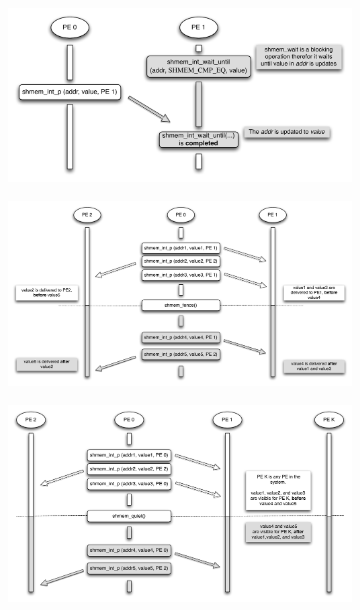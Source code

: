 \begin{figure}
        \begin{subfigure}{0.5\textwidth}
                \includegraphics[width=\textwidth]{diagrams/updated/wait}
                \caption{}
                \label{fig:wait}
        \end{subfigure}
        \begin{subfigure}{0.49\textwidth}
                \includegraphics[width=\textwidth]{diagrams/updated/fence}
                \caption{}
                \label{fig:fence}
        \end{subfigure}
        \begin{subfigure}{0.48\textwidth}
                \includegraphics[width=\textwidth]{diagrams/updated/quiet}

\end{subfigure}
\end{figure}
